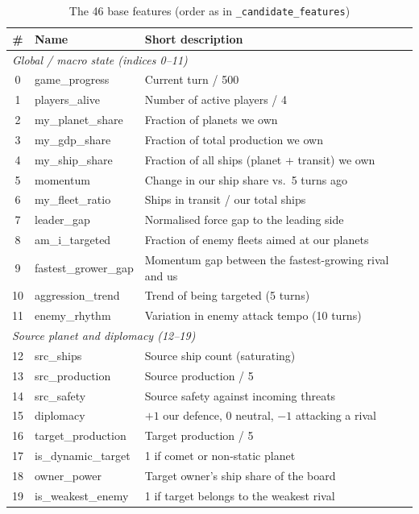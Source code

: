 \documentclass[conference]{IEEEtran}
\begin{document}
\begin{table}[htbp]
\caption{The 46 base features (order as in \texttt{\_candidate\_features})}
\label{tab:features}
\centering
\small
\begin{tabular}{clp{8.5cm}}
\toprule
\textbf{\#} & \textbf{Name} & \textbf{Short description} \\
\midrule
\multicolumn{3}{l}{\textit{Global / macro state (indices 0--11)}} \\
0 & game\_progress & Current turn / 500 \\
1 & players\_alive & Number of active players / 4 \\
2 & my\_planet\_share & Fraction of planets we own \\
3 & my\_gdp\_share & Fraction of total production we own \\
4 & my\_ship\_share & Fraction of all ships (planet + transit) we own \\
5 & momentum & Change in our ship share vs.\ 5 turns ago \\
6 & my\_fleet\_ratio & Ships in transit / our total ships \\
7 & leader\_gap & Normalised force gap to the leading side \\
8 & am\_i\_targeted & Fraction of enemy fleets aimed at our planets \\
9 & fastest\_grower\_gap & Momentum gap between the fastest-growing rival and us \\
10 & aggression\_trend & Trend of being targeted (5 turns) \\
11 & enemy\_rhythm & Variation in enemy attack tempo (10 turns) \\
\midrule
\multicolumn{3}{l}{\textit{Source planet and diplomacy (12--19)}} \\
12 & src\_ships & Source ship count (saturating) \\
13 & src\_production & Source production / 5 \\
14 & src\_safety & Source safety against incoming threats \\
15 & diplomacy & $+1$ our defence, $0$ neutral, $-1$ attacking a rival \\
16 & target\_production & Target production / 5 \\
17 & is\_dynamic\_target & 1 if comet or non-static planet \\
18 & owner\_power & Target owner's ship share of the board \\
19 & is\_weakest\_enemy & 1 if target belongs to the weakest rival \\

\end{tabular}
\end{table}
\end{document}
